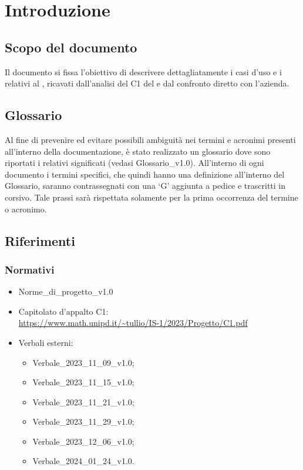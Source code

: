 \chapter{Introduzione} \label{cap:intro}
\section{Scopo del documento}
Il documento si fissa l'obiettivo di descrivere dettagliatamente i casi d’uso e i  relativi al   , ricavati dall’analisi del  C1 del   e dal confronto diretto con l'azienda.
\section{Glossario}
Al fine di prevenire ed evitare possibili ambiguità nei termini e acronimi presenti all’interno della documentazione, è stato realizzato un glossario dove sono riportati i relativi significati (vedasi Glossario\_v1.0). All’interno di ogni documento i termini specifici, che quindi hanno una definizione all’interno del Glossario, saranno contrassegnati con una ‘G’ aggiunta a pedice e trascritti in corsivo. Tale prassi sarà rispettata solamente per la prima occorrenza del termine o acronimo.
\section{Riferimenti}
\subsection{Normativi}
\begin{itemize}
    \item Norme\_di\_progetto\_v1.0
    \item Capitolato d'appalto C1: \\ \url{https://www.math.unipd.it/~tullio/IS-1/2023/Progetto/C1.pdf}
    \item Verbali esterni:
        \begin{itemize}
            \item Verbale\_2023\_11\_09\_v1.0;
            \item Verbale\_2023\_11\_15\_v1.0;
            \item Verbale\_2023\_11\_21\_v1.0;
            \item Verbale\_2023\_11\_29\_v1.0;
            \item Verbale\_2023\_12\_06\_v1.0;
            \item Verbale\_2024\_01\_24\_v1.0.
        \end{itemize}
\end{itemize}


